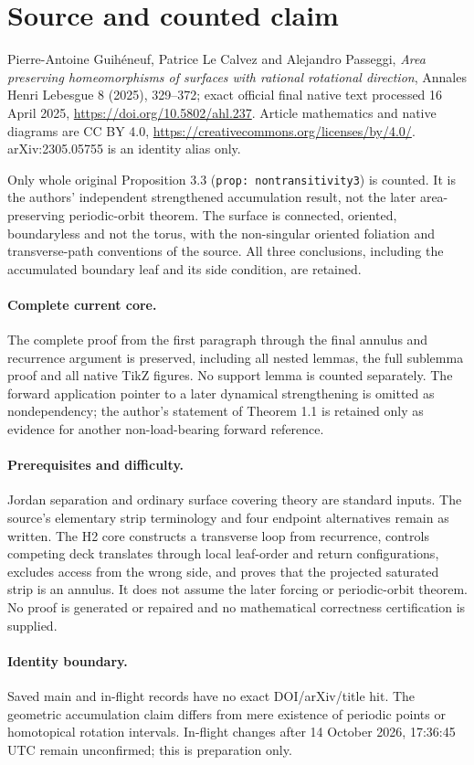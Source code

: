 \section*{Source and counted claim}
Pierre-Antoine Guih\'eneuf, Patrice Le Calvez and Alejandro Passeggi, \emph{Area preserving homeomorphisms of surfaces with rational rotational direction}, Annales Henri Lebesgue 8 (2025), 329--372; exact official final native text processed 16 April 2025, \url{https://doi.org/10.5802/ahl.237}. Article mathematics and native diagrams are CC BY 4.0, \url{https://creativecommons.org/licenses/by/4.0/}. arXiv:2305.05755 is an identity alias only.

Only whole original Proposition 3.3 (\texttt{prop: nontransitivity3}) is counted. It is the authors' independent strengthened accumulation result, not the later area-preserving periodic-orbit theorem. The surface is connected, oriented, boundaryless and not the torus, with the non-singular oriented foliation and transverse-path conventions of the source. All three conclusions, including the accumulated boundary leaf and its side condition, are retained.

\paragraph{Complete current core.} The complete proof from the first paragraph through the final annulus and recurrence argument is preserved, including all nested lemmas, the full sublemma proof and all native TikZ figures. No support lemma is counted separately. The forward application pointer to a later dynamical strengthening is omitted as nondependency; the author's statement of Theorem 1.1 is retained only as evidence for another non-load-bearing forward reference.

\paragraph{Prerequisites and difficulty.} Jordan separation and ordinary surface covering theory are standard inputs. The source's elementary strip terminology and four endpoint alternatives remain as written. The H2 core constructs a transverse loop from recurrence, controls competing deck translates through local leaf-order and return configurations, excludes access from the wrong side, and proves that the projected saturated strip is an annulus. It does not assume the later forcing or periodic-orbit theorem. No proof is generated or repaired and no mathematical correctness certification is supplied.

\paragraph{Identity boundary.} Saved main and in-flight records have no exact DOI/arXiv/title hit. The geometric accumulation claim differs from mere existence of periodic points or homotopical rotation intervals. In-flight changes after 14 October 2026, 17:36:45 UTC remain unconfirmed; this is preparation only.
